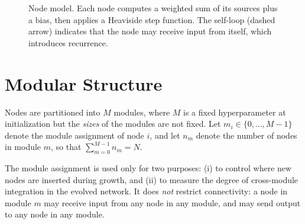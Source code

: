 \begin{figure}[h]
  \centering
  \caption{Node model. Each node computes a weighted sum of its
    sources plus a bias, then applies a Heaviside step function. The
    self-loop (dashed arrow) indicates that the node may receive input
    from itself, which introduces recurrence.}
  \label{fig:node-model}
\end{figure}

\section{Modular Structure}
\label{sec:modular-structure}

Nodes are partitioned into $M$ modules, where $M$ is a fixed
hyperparameter at initialization but the \emph{sizes} of the modules
are not fixed. Let $m_i \in \{0, \ldots, M-1\}$ denote the module
assignment of node $i$, and let $n_m$ denote the number of nodes in
module $m$, so that $\sum_{m=0}^{M-1} n_m = N$.

The module assignment is used only for two purposes: (i) to control
where new nodes are inserted during growth, and (ii) to measure the
degree of cross-module integration in the evolved network. It does
\emph{not} restrict connectivity: a node in module $m$ may receive
input from any node in any module, and may send output to any node in
any module.

